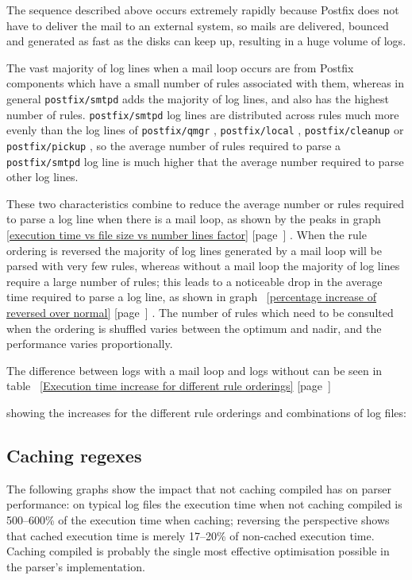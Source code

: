 \documentclass[a4paper,12pt,draft]{article}
\newcommand{\refwithpage}[1]{%
    \empty{}\ref{#1} [page~\pageref{#1}]%
}
\newcommand{\daemon}[1]{%
    \texttt{postfix/#1}%
}
\begin{document}
The sequence described above occurs extremely rapidly because Postfix does
not have to deliver the mail to an external system, so mails are delivered,
bounced and generated as fast as the disks can keep up, resulting in a huge
volume of logs.

The vast majority of log lines when a mail loop occurs are from Postfix
components which have a small number of rules associated with them, whereas
in general \daemon{smtpd} adds the majority of log lines, and also has the
highest number of rules.  \daemon{smtpd} log lines are distributed across
rules much more evenly than the log lines of \daemon{qmgr}, \daemon{local},
\daemon{cleanup} or \daemon{pickup}, so the average number of rules
required to parse a \daemon{smtpd} log line is much higher that the average
number required to parse other log lines.

These two characteristics combine to reduce the average number or rules
required to parse a log line when there is a mail loop, as shown by the
peaks in graph~\refwithpage{execution time vs file size vs number lines
factor}.  When the rule ordering is reversed the majority of log lines
generated by a mail loop will be parsed with very few rules, whereas
without a mail loop the majority of log lines require a large number of
rules; this leads to a noticeable drop in the average time required to
parse a log line, as shown in graph~\refwithpage{percentage increase of
reversed over normal}.  The number of rules which need to be consulted when
the ordering is shuffled varies between the optimum and nadir, and the
performance varies proportionally.

The difference between logs with a mail loop and logs without can be seen
in table~\refwithpage{Execution time increase for different rule orderings}
showing the increases for the different rule orderings and combinations of
log files:



\subsection{Caching regexes}

\label{Caching regexes}

The following graphs show the impact that not caching compiled \regexes{}
has on parser performance: on typical log files the execution time when not
caching compiled \regexes{} is 500--600\% of the execution time when
caching; reversing the perspective shows that cached execution time is
merely 17--20\% of non-cached execution time.  Caching compiled \regexes{}
is probably the single most effective optimisation possible in the parser's
implementation.
\end{document}
